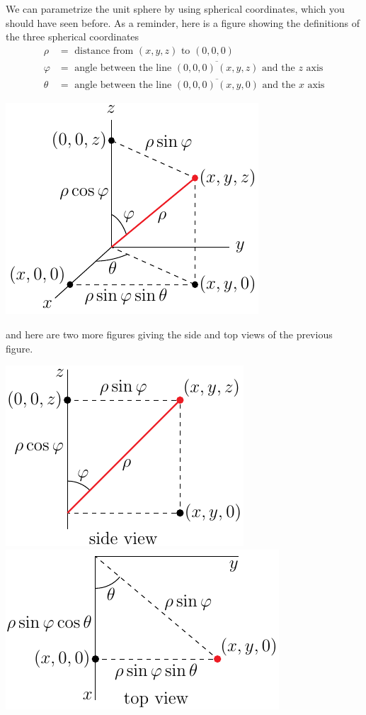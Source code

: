 \begin{eg}[Sphere]
We can parametrize the unit sphere by using spherical coordinates,
which you should have seen before.
As a reminder, here is a figure showing the definitions of the 
three spherical coordinates
\begin{align*}
\rho&=\text{ distance from }(x,y,z)\text{ to }(0,0,0)\\
\varphi&=\text{ angle between the line }\overline{(0,0,0)\,(x,y,z)}
\text{ and the $z$ axis}\\
\theta&=\text{ angle between the line }\overline{(0,0,0)\,(x,y,0)}
\text{ and the $x$ axis}
\end{align*}
\begin{efig}
\begin{center}
    \includegraphics{spherical.pdf}
\end{center}
\end{efig}
and here are two more figures giving the side and top views of the 
previous figure.
\begin{efig}
\begin{center}
    \includegraphics{sphericalSide.pdf}\qquad
    \includegraphics{sphericalTop.pdf}\qquad

\end{center}
\end{efig}
\end{eg}
